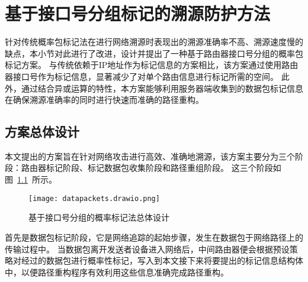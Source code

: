 \chapter{基于接口号分组标记的溯源防护方法}
\label{cha:IGPPM}
针对传统概率包标记法在进行网络溯源时表现出的溯源准确率不高、溯源速度慢的缺点，本小节对此进行了改进，设计并提出了一种基于路由器接口号分组的概率包标记方案。
与传统依赖于IP地址作为标记信息的方案相比，该方案通过使用路由器接口号作为标记信息，显著减少了对单个路由信息进行标记所需的空间。
此外，通过结合异或运算的特性，本方案能够利用服务器端收集到的数据包标记信息在确保溯源准确率的同时进行快速而准确的路径重构。



\section{方案总体设计}

本文提出的方案旨在针对网络攻击进行高效、准确地溯源，该方案主要分为三个阶段：路由器标记阶段、标记数据包收集阶段和路径重组阶段。
这三个阶段如图~\ref{fig:our_datapackets_design}~所示。
\begin{figure}[h]
  \centering
  \texttt{[image: datapackets.drawio.png]}
  \caption{基于接口号分组的概率标记法总体设计}
  \label{fig:our_datapackets_design}
\end{figure}
首先是数据包标记阶段，它是网络追踪的起始步骤，发生在数据包于网络路径上的传输过程中。
当数据包离开发送者设备进入网络后，中间路由器便会根据预设策略对经过的数据包进行概率性标记，写入到本文接下来将要提出的标记信息结构体中，以便路径重构程序有效利用这些信息准确完成路径重构。

